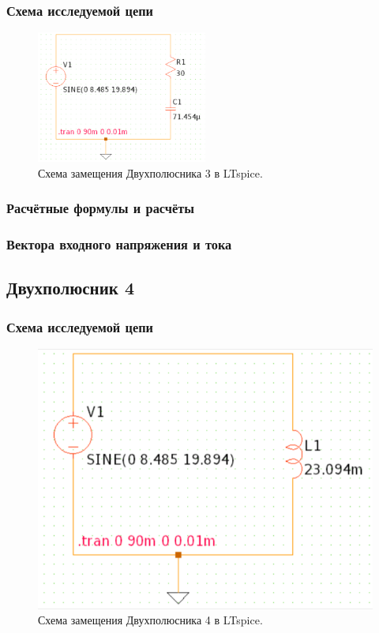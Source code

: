 \subsubsection{Схема исследуемой цепи}
\begin{figure}[H]
	\centering
	\includegraphics[width=0.5\textwidth]{./data/schema3}
	\caption{Схема замещения Двухполюсника 3 в LTspice.}
\end{figure}
\subsubsection{Расчётные формулы и расчёты}

\subsubsection{Вектора входного напряжения и тока}


\subsection{Двухполюсник 4}
\subsubsection{Схема исследуемой цепи}
\begin{figure}[H]
	\centering
	\includegraphics[width=1\textwidth]{./data/schema4}
	\caption{Схема замещения Двухполюсника 4 в LTspice.}
\end{figure}
